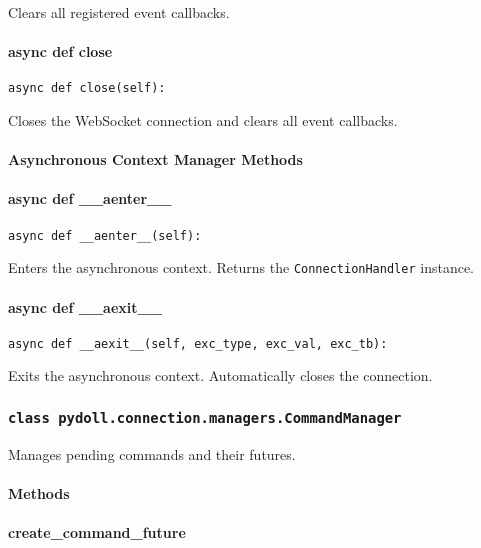 \documentclass{article}
\begin{document}
\noindent Clears all registered event callbacks.

\paragraph{async def close}

\begin{lstlisting}[style=pythonstyle]
async def close(self):
\end{lstlisting}

\noindent Closes the WebSocket connection and clears all event callbacks.

\paragraph{Asynchronous Context Manager Methods}
\paragraph{async def \_\_aenter\_\_}

\begin{lstlisting}[style=pythonstyle]
async def __aenter__(self):
\end{lstlisting}

\noindent Enters the asynchronous context. Returns the \lstinline[style=pythonstyle]|ConnectionHandler| instance.

\paragraph{async def \_\_aexit\_\_}

\begin{lstlisting}[style=pythonstyle]
async def __aexit__(self, exc_type, exc_val, exc_tb):
\end{lstlisting}

\noindent Exits the asynchronous context. Automatically closes the connection.

\subsubsection*{\texttt{class pydoll.connection.managers.CommandManager}}
\noindent Manages pending commands and their futures.

\paragraph{Methods}
\paragraph{create\_command\_future}
\end{document}
